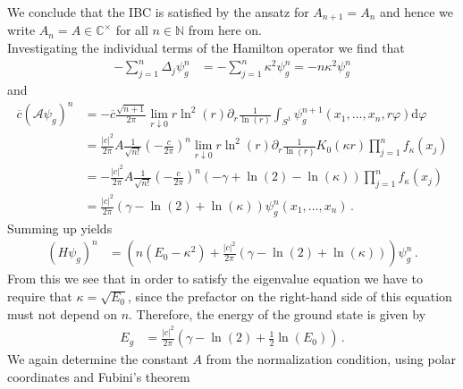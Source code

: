 We conclude that the IBC is satisfied by the ansatz for $A_{n + 1} = A_{n}$ and hence we write $A_{n} = A \in \mathbb{C}^{\times}$ for all $n \in \mathbb{N}$ from here on.
\\
Investigating the individual terms of the Hamilton operator we find that
\begin{align*}
  -
  \sum_{j = 1}^{n}
  \Delta_{j}
  \psi_{g}^{n}
  &=
  -
  \sum_{j = 1}^{n}
  \kappa^{2}
  \psi_{g}^{n}
  =
  -
  n
  \kappa^{2}
  \psi_{g}^{n}
\end{align*}
and
\begin{align*}
  \overline{c}
  (\mathcal{A}\psi_{g})^{n}
  &=
  -
  \overline{c}
  \frac{\sqrt{n + 1}}{2\pi}
  \lim_{r \downarrow 0}
  r\ln^{2}(r)
  \partial_{r}
  \frac{1}{\ln(r)}
  \int_{S^{1}}
  \psi_{g}^{n + 1}
  \left(
    x_{1}
    ,
    \dots
    ,
    x_{n}
    ,
    r\varphi
  \right)
  \mathrm{d}\varphi
  \\
  &=
  \frac{\vert c \vert^{2}}{2\pi}
  A
  \frac{1}{\sqrt{n!}}
  \left(
    -
    \frac{c}{2\pi}
  \right)^{n}
  \lim_{r \downarrow 0}
  r\ln^{2}(r)
  \partial_{r}
  \frac{1}{\ln(r)}
  K_{0}(\kappa r)
  \prod_{j = 1}^{n}
  f_{\kappa}(x_{j})
  \\
  &=
  -
  \frac{\vert c \vert^{2}}{2\pi}
  A
  \frac{1}{\sqrt{n!}}
  \left(
    -
    \frac{c}{2\pi}
  \right)^{n}
  \left(
    -
    \gamma
    +
    \ln(2)
    -
    \ln(\kappa)
  \right)
  \prod_{j = 1}^{n}
  f_{\kappa}(x_{j})
  \\
  &=
  \frac{\vert c \vert^{2}}{2\pi}
  \left(
    \gamma
    -
    \ln(2)
    +
    \ln(\kappa)
  \right)
  \psi_{g}^{n}
  \left(
    x_{1}
    ,
    \dots
    ,
    x_{n}
  \right)
  \,.
\end{align*}
Summing up yields
\begin{align*}
  (H\psi_{g})^{n}
  &=
  \left(
    n
    (E_{0} - \kappa^{2})
    +
    \frac{\vert c \vert^{2}}{2\pi}
    \left(
      \gamma
      -
      \ln(2)
      +
      \ln(\kappa)
    \right)
  \right)
  \psi_{g}^{n}
  \,.
\end{align*}
From this we see that in order to satisfy the eigenvalue equation we have to require that $\kappa = \sqrt{E_{0}}$, since the prefactor on the right-hand side of this equation must not depend on $n$. Therefore, the energy of the ground state is given by
\begin{align*}
  E_{g}
  &=
  \frac{\vert c \vert^{2}}{2\pi}
  \left(
    \gamma
    -
    \ln(2)
    +
    \frac{1}{2}
    \ln(E_{0})
  \right)
  \,.
\end{align*}
We again determine the constant $A$ from the normalization condition, using polar coordinates and Fubini's theorem
